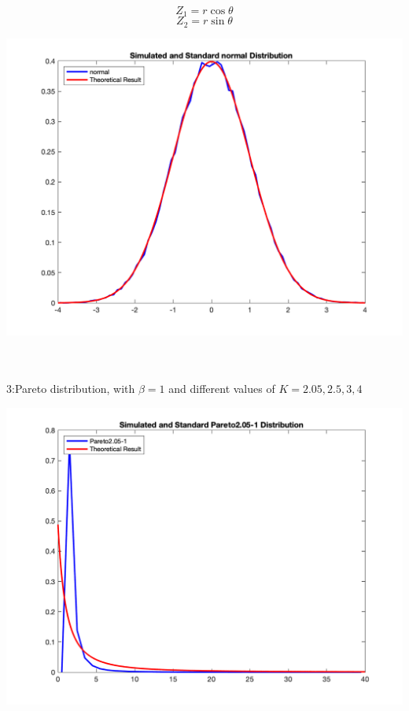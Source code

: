 \begin{equation}
    Z_{1}=r\cos \theta   
\end{equation}
\begin{equation}
    Z_{2}= r\sin \theta
\end{equation}
\begin{center}
    \includegraphics[scale=0.4]{Figures/figure3_2.png}\\
\end{center}\\
\\
3:Pareto distribution, with $\beta=1$ and different values of $K=2.05,2.5,3,4$\\
\begin{center}
    \includegraphics[scale=0.4]{Figures/figure3_3.png}\\
\end{center}\\

